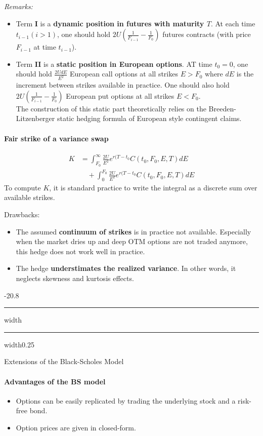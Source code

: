 \documentclass[a4paper,landscape,7pt,fleqn]{scrartcl}
\makeatletter
\renewcommand{\emph}[1]{\textbf{#1}}
\renewcommand{\section}{\@startsection{section}{1}{0mm}%
{-2\baselineskip}{0.8\baselineskip}%
{\hrule depth 0.2pt width\columnwidth\hrule depth1.5pt
width0.25\columnwidth\vspace*{1.2em}\Large\bfseries}}
\makeatother
\begin{document}
\begin{multicols*}{3}
\textit{Remarks:}
\begin{itemize}
\item Term \emph{I} is a \emph{dynamic position in futures with maturity $T$}. At each time $t_{i-1} (i >1)$, one should hold $2U \left( \frac{1}{F_{i-1}} - \frac{1}{F_0} \right)$ futures contracts (with price $F_{i-1}$ at time $t_{i-1}$).
\item Term \emph{II} is a \emph{static position in European options}. AT time $t_0 = 0$, one should hold $\frac{2U dE}{E^2}$ European call options at all strikes $E > F_0$ where $dE$ is the increment between strikes available in practice. One should also hold $2U \left( \frac{1}{F_{i-1}} - \frac{1}{F_0} \right)$ European put options at all strikes $E < F_0$. \\
The construction of this static part theoretically relies on the Breeden-Litzenberger static hedging formula of European style contingent claims.
\end{itemize}

\paragraph{Fair strike of a variance swap}
\begin{align*}
K &= \int_{F_0}^\infty \frac{2 U}{E^2} e^{r (T-t_0} C(t_0,F_0,E,T) dE \\
& \quad + \int_0^{F_0} \frac{2 U}{E^2} e^{r (T-t_0} C(t_0,F_0,E,T) dE
\end{align*}
To compute $K$, it is standard practice to write the integral as a discrete sum over available strikes.

Drawbacks:
\begin{itemize}
\item The assumed \emph{continuum of strikes} is in practice not available. Especially when the market dries up and deep OTM options are not traded anymore, this hedge does not work well in practice.
\item The hedge \emph{understimates the realized variance}. In other words, it neglects skewness and kurtosis effects.
\end{itemize}

\columnbreak

\section{Extensions of the Black-Scholes Model}

\paragraph{Advantages of the BS model}
\begin{itemize}
\item Options can be easily replicated by trading the underlying stock and a risk-free bond.
\item Option prices are given in closed-form.
\end{itemize}


\end{multicols*}
\end{document}
